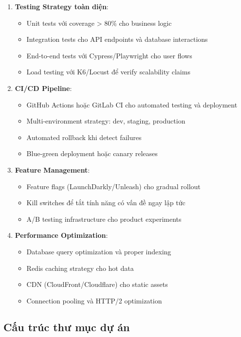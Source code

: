 \begin{enumerate}
    \item \textbf{Testing Strategy toàn diện}:
    \begin{itemize}
        \item Unit tests với coverage > 80\% cho business logic
        \item Integration tests cho API endpoints và database interactions
        \item End-to-end tests với Cypress/Playwright cho user flows
        \item Load testing với K6/Locust để verify scalability claims
    \end{itemize}
    
    \item \textbf{CI/CD Pipeline}:
    \begin{itemize}
        \item GitHub Actions hoặc GitLab CI cho automated testing và deployment
        \item Multi-environment strategy: dev, staging, production
        \item Automated rollback khi detect failures
        \item Blue-green deployment hoặc canary releases
    \end{itemize}
    
    \item \textbf{Feature Management}:
    \begin{itemize}
        \item Feature flags (LaunchDarkly/Unleash) cho gradual rollout
        \item Kill switches để tắt tính năng có vấn đề ngay lập tức
        \item A/B testing infrastructure cho product experiments
    \end{itemize}
    
    \item \textbf{Performance Optimization}:
    \begin{itemize}
        \item Database query optimization và proper indexing
        \item Redis caching strategy cho hot data
        \item CDN (CloudFront/Cloudflare) cho static assets
        \item Connection pooling và HTTP/2 optimization
    \end{itemize}
\end{enumerate}

\subsection{Cấu trúc thư mục dự án}



